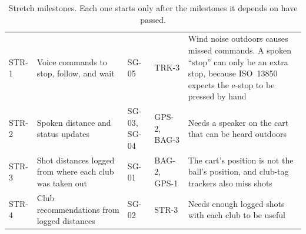 \begin{table}[!htbp]
\centering
\caption{Stretch milestones. Each one starts only after the milestones it depends on have passed.}
\label{tab:stretch}
\footnotesize\renewcommand{\arraystretch}{1.0}
\begin{tabularx}{\linewidth}{@{}L{0.42in} L{1.75in} L{0.62in} L{0.85in} Y@{}}
 &  &  &  &  \\
\midrule
STR-1 & Voice commands to stop, follow, and wait & SG-05 & TRK-3 & Wind noise outdoors causes missed commands. A spoken ``stop'' can only be an extra stop, because ISO~13850 expects the e-stop to be pressed by hand~\cite{iso13850} \\
\addlinespace[2pt]
STR-2 & Spoken distance and status updates & SG-03, SG-04 & GPS-2, BAG-3 & Needs a speaker on the cart that can be heard outdoors \\
\addlinespace[2pt]
STR-3 & Shot distances logged from where each club was taken out & SG-01 & BAG-2, GPS-1 & The cart's position is not the ball's position, and club-tag trackers also miss shots~\cite{hall2025golfGps} \\
\addlinespace[2pt]
STR-4 & Club recommendations from logged distances & SG-02 & STR-3 & Needs enough logged shots with each club to be useful \\
\bottomrule
\end{tabularx}
\end{table}

